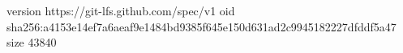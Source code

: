 version https://git-lfs.github.com/spec/v1
oid sha256:a4153e14ef7a6aeaf9e1484bd9385f645e150d631ad2c9945182227dfddf5a47
size 43840
